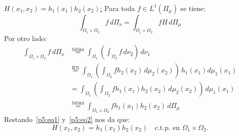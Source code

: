 \documentclass[11pt]{article}
\newenvironment{Solucion}[1][]
{%
  \newline
	\noindent{\ttfamily SOLUCIÓN}~
}%
{%
}
\begin{document}
\begin{Solucion}
  \vspace{1em}
  \noindent\underline{\(H(x_1, x_2) = h_1(x_1) h_2(x_2)\):}
  Para toda \(f \in L^1(\Pi_{\mu})\) se tiene:
  \begin{equation}\label{p5:eq1}
    \int_{\Omega_1\times\Omega_2} f \, d\Pi_{\nu}
    =
    \int_{\Omega_1\times\Omega_2} f H \, d\Pi_{\mu}
  \end{equation}
  Por otro lado: 
  \begin{equation}\label{p5:eq2}
  \begin{aligned}
    \int_{\Omega_1\times\Omega_2} f \, d\Pi_{\nu}
    &\overset{\text{fubini}}{=} 
    \int_{\Omega_1}
      \left( 
       \int_{\Omega_2}
        f
       \, d\nu_2
      \right)
      \, d\nu_1
    \\&\overset{\text{RN}}{=} 
    \int_{\Omega_1} 
      \left(
        \int_{\Omega_2} 
          f h_2(x_2)
        \, d\mu_2(x_2) 
      \right) 
    \, h_1(x_1) d\mu_1(x_1)
    \\&= 
    \int_{\Omega_1} 
      \left(
        \int_{\Omega_2} f h_1(x_1) h_2(x_2)
        \, d\mu_2(x_2)
      \right)
    \, d\mu_1(x_1) 
    \\&\overset{\text{fubini}}{=} 
    \int_{\Omega_1\times\Omega_2} f h_1(x_1) h_2(x_2) \, d\Pi_{\mu}
  \end{aligned}
  \end{equation}
  Restando~\eqref{p5:eq1} y~\eqref{p5:eq2} nos da que:
  \begin{displaymath}
    H(x_1,x_2) = h_1(x_1) h_2(x_2) 
    \quad\text{c.t.p. en } \Omega_1\times\Omega_2. 
  \end{displaymath}
\end{Solucion}
\end{document}
